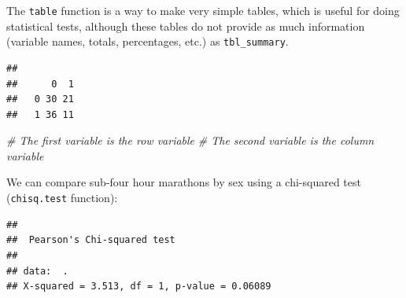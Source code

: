 \documentclass[]{book}
\newenvironment{Shaded}{\begin{snugshade}}{\end{snugshade}}
\newcommand{\CommentTok}[1]{\textcolor[rgb]{0.56,0.35,0.01}{\textit{#1}}}
\newcommand{\DataTypeTok}[1]{\textcolor[rgb]{0.13,0.29,0.53}{#1}}
\newcommand{\DecValTok}[1]{\textcolor[rgb]{0.00,0.00,0.81}{#1}}
\newcommand{\KeywordTok}[1]{\textcolor[rgb]{0.13,0.29,0.53}{\textbf{#1}}}
\newcommand{\NormalTok}[1]{#1}
\newcommand{\OperatorTok}[1]{\textcolor[rgb]{0.81,0.36,0.00}{\textbf{#1}}}
\newcommand{\OtherTok}[1]{\textcolor[rgb]{0.56,0.35,0.01}{#1}}
\newcommand{\StringTok}[1]{\textcolor[rgb]{0.31,0.60,0.02}{#1}}
\begin{document}
\begin{Shaded}
\end{Shaded}

The \texttt{table} function is a way to make very simple tables, which is useful for doing statistical tests, although these tables do not provide as much information (variable names, totals, percentages, etc.) as \texttt{tbl\_summary}.

\begin{Shaded}
\end{Shaded}

\begin{verbatim}
##    
##      0  1
##   0 30 21
##   1 36 11
\end{verbatim}

\begin{Shaded}
\begin{Highlighting}[]
\CommentTok{# The first variable is the row variable}
\CommentTok{# The second variable is the column variable}
\end{Highlighting}
\end{Shaded}

We can compare sub-four hour marathons by sex using a chi-squared test (\texttt{chisq.test} function):

\begin{Shaded}
\end{Shaded}

\begin{verbatim}
## 
##  Pearson's Chi-squared test
## 
## data:  .
## X-squared = 3.513, df = 1, p-value = 0.06089
\end{verbatim}
\end{document}
